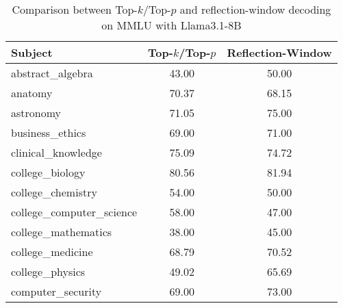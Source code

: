 \newpage

\begingroup
\renewcommand{\arraystretch}{1}
\begin{table}[t]
    \caption{Comparison between Top-$k$/Top-$p$ and reflection-window decoding on MMLU with Llama3.1-8B}
    \label{tab:decoding_comparison_llama}
    \centering
    \footnotesize
    \begin{tabular}{L{0.35}C{0.20}C{0.20}}
        \toprule
        \textbf{Subject}                        & \textbf{Top-$k$/Top-$p$} & \textbf{Reflection-Window} \\
        \midrule
        abstract\_algebra                       & 43.00                    & 50.00                      \\
        anatomy                                 & 70.37                    & 68.15                      \\
        astronomy                               & 71.05                    & 75.00                      \\
        business\_ethics                        & 69.00                    & 71.00                      \\
        clinical\_knowledge                     & 75.09                    & 74.72                      \\
        college\_biology                        & 80.56                    & 81.94                      \\
        college\_chemistry                      & 54.00                    & 50.00                      \\
        college\_computer\_science              & 58.00                    & 47.00                      \\
        college\_mathematics                    & 38.00                    & 45.00                      \\
        college\_medicine                       & 68.79                    & 70.52                      \\
        college\_physics                        & 49.02                    & 65.69                      \\
        computer\_security                      & 69.00                    & 73.00                      \\

\end{tabular}
\end{table}
